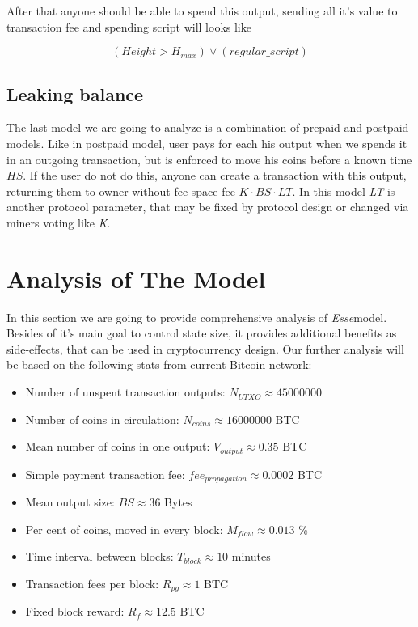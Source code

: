 \documentclass[]{article}   %
\newcommand{\esse}{\textit{Esse}}
\begin{document}
After that anyone should be able to spend this output, sending all it's value to transaction fee and spending script will looks like

\begin{equation}
(Height > H_{max}) \lor (regular\_script)
\end{equation}

\subsection{Leaking balance}

The last model we are going to analyze is a combination of prepaid and postpaid models. Like in postpaid model, user pays for each his output when we spends it in an outgoing transaction, but is enforced to move his coins before a known time \textit{$HS$}. If the user do not do this, anyone can create a transaction with this output, returning them to owner without fee-space fee ${K \cdot BS \cdot LT}$. In this model \textit{LT} is another protocol parameter, that may be fixed by protocol design or changed via miners voting like \textit{K}.

\section{Analysis of The Model}
\label{sec:analysis}

In this section we are going to provide comprehensive analysis of \esse model. Besides of it's main goal to control state size, it provides additional benefits as side-effects, that can be used in cryptocurrency design. Our further analysis will be based on the following stats from current Bitcoin network:

\begin{itemize}
  \item Number of unspent transaction outputs: $N_{UTXO} \approx 45000000$
  \item Number of coins in circulation: $N_{coins} \approx 16000000$ BTC
  \item Mean number of coins in one output: $V_{output} \approx 0.35$ BTC
  \item Simple payment transaction fee: $fee_{propagation} \approx 0.0002$ BTC
  \item Mean output size: $BS \approx 36$ Bytes
  \item Per cent of coins, moved in every block: $M_{flow} \approx 0.013$ \%
  \item Time interval between blocks: $T_{block} \approx 10$ minutes
  \item Transaction fees per block: $R_{pg} \approx 1$ BTC
  \item Fixed block reward: $R_{f} \approx 12.5$ BTC
\end{itemize}
\end{document}
